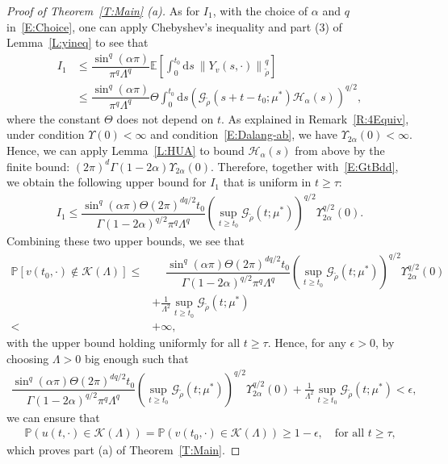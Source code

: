 \documentclass[sn-mathphys]{sn-jnl}%
\newcommand{\E}{\mathbb{E}}
\newcommand{\Norm}[1]{\left\| #1 \right\|}
\newcommand{\ud}{\ensuremath{\mathrm{d}}}
\numberwithin{equation}{section}
\theoremstyle{thmstyleone}%
\theoremstyle{thmstyletwo}%
\theoremstyle{thmstylethree}%
\begin{document}
\begin{proof}[Proof of Theorem~\ref{T:Main} (a)]
  As for $I_1$, with the choice of $\alpha$ and $q$ in~\eqref{E:Choice}, one can apply Chebyshev's
  inequality and part (3) of Lemma~\ref{L:yineq} to see that
  \begin{align*}
    I_1 & \le \dfrac{\sin^q (\alpha \pi)}{\pi^q \Lambda^q}\E \left[\int_{0}^{t_0} \ud s\: \Norm{Y_v(s,\cdot)}_{\tilde{\rho}}^q\right] \\
        & \le \dfrac{\sin^q (\alpha \pi)}{\pi^q \Lambda^q} \Theta\int_0^{t_0} \ud s
          \left(\mathcal{G}_{\tilde{\rho}}(s + t-t_0;\mu^*) \mathcal{H}_{\alpha}(s)\right)^{q/2},
  \end{align*}
  where the constant $\Theta$ does not depend on $t$. As explained in Remark~\ref{R:4Equiv}, under
  condition $\Upsilon(0)<\infty$ and condition~\eqref{E:Dalang-ab}, we have
  $\Upsilon_{2\alpha}(0)<\infty$. Hence, we can apply Lemma~\ref{L:HUA} to bound
  $\mathcal{H}_{\alpha}(s)$ from above by the finite bound: $\left(2\pi\right)^d \Gamma(1-2\alpha)
  \Upsilon_{2\alpha}(0)$. Therefore, together with~\eqref{E:GtBdd}, we obtain the following upper
  bound for $I_1$ that is uniform in $t\ge \tau$:
  \begin{align*}
    I_1 \le \dfrac{\sin^q (\alpha \pi)\Theta (2\pi)^{dq/2} t_0}{\Gamma\left(1-2\alpha\right)^{q/2}\pi^q \Lambda^q} \left(\sup_{t\ge t_0} \mathcal{G}_{\tilde{\rho}}\left(t;\mu^*\right)\right)^{q/2} \Upsilon_{2\alpha}^{q/2}(0).
  \end{align*}
  Combining these two upper bounds, we see that
  \begin{align*}
    \mathbb{P} \left[ v(t_0,\cdot) \not \in \mathscr{K}(\Lambda) \right ]
    \le & \phantom{+}\dfrac{\sin^q (\alpha \pi)\Theta (2\pi)^{dq/2} t_0}{\Gamma\left(1-2\alpha\right)^{q/2}\pi^q \Lambda^q} \left(\sup_{t\ge t_0} \mathcal{G}_{\tilde{\rho}}\left(t;\mu^*\right)\right)^{q/2} \Upsilon_{2\alpha}^{q/2}(0) \\
        & + \frac{1}{\Lambda^2} \sup_{t\ge t_0} \mathcal{G}_{\tilde{\rho}}\left(t;\mu^*\right)                                                                                                                                 \\
    <   & +\infty,
  \end{align*}
  with the upper bound holding uniformly for all $t\ge \tau$. Hence, for any $\epsilon>0$, by
  choosing $\Lambda > 0$ big enough such that
  \begin{align*}
    \dfrac{\sin^q (\alpha \pi)\Theta (2\pi)^{dq/2} t_0}{\Gamma\left(1-2\alpha\right)^{q/2}\pi^q \Lambda^q} \left(\sup_{t\ge t_0} \mathcal{G}_{\tilde{\rho}}\left(t;\mu^*\right)\right)^{q/2} \Upsilon_{2\alpha}^{q/2}(0)
    +
    \frac{1}{\Lambda^2} \sup_{t\ge t_0} \mathcal{G}_{\tilde{\rho}}\left(t;\mu^*\right)
    < \epsilon,
  \end{align*}
  we can ensure that
  \begin{align*}
      \mathbb{P}\left(u(t,\cdot) \in \mathscr{K}(\Lambda)\right)
    = \mathbb{P}\left(v(t_0,\cdot) \in \mathscr{K}(\Lambda)\right)
    \ge 1- \epsilon, \quad \text{for all $t\ge \tau$,}
  \end{align*}
  which proves part (a) of Theorem~\ref{T:Main}.
\end{proof}
\end{document}
